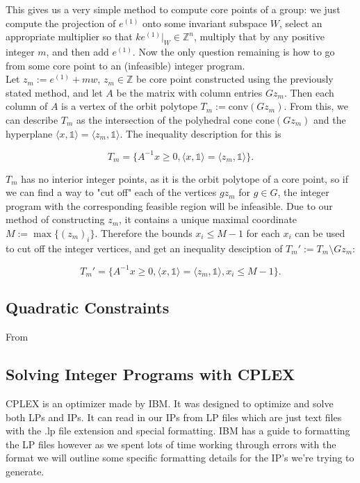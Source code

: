 \documentclass[11pt]{article} %
\theoremstyle{definition}
\theoremstyle{remark}
\newcommand{\ZZ}{\mathbb{Z}}
\begin{document}
This gives us a very simple method to compute core points of a group: we just compute the projection of $e^{(1)}$ onto some invariant subspace $W$, select an appropriate multiplier so that $ke^{(1)}|_W \in \ZZ^n$, multiply that by any positive integer $m$, and then add $e^{(1)}$. Now the only question remaining is how to go from some core point to an (infeasible) integer program.\\

Let $z_m := e^{(1)} + mw$, $z_m \in \ZZ$ be core point constructed using the previously stated method, and let $A$ be the matrix with column entries $Gz_m$. Then each column of $A$ is a vertex of the orbit polytope $T_m := \textrm{conv}(Gz_m)$. From this, we can describe $T_m$ as the intersection of the polyhedral cone $\textrm{cone}(Gz_m)$ and the hyperplane $\langle x,\mathds{1} \rangle = \langle z_m, \mathds{1} \rangle$. The inequality description for this is

\[ T_m = \lbrace A^{-1}x \geq 0, \langle x,\mathds{1} \rangle = \langle z_m, \mathds{1} \rangle \rbrace .\]

$T_m$ has no interior integer points, as it is the orbit polytope of a core point, so if we can find a way to "cut off" each of the vertices $gz_m$ for $g \in G$, the integer program with the corresponding feasible region will be infeasible. Due to our method of constructing $z_m$, it contains a unique maximal coordinate $M := \max \lbrace {(z_m)_i} \rbrace$. Therefore the bounds $x_i \leq M-1$ for each $x_i$ can be used to cut off the integer vertices, and get an inequality desciption of $T_m' := T_m \setminus Gz_m$:

\[ T_m' = \lbrace A^{-1}x \geq 0, \langle x,\mathds{1} \rangle = \langle z_m, \mathds{1} \rangle, x_i \leq M-1 \rbrace .\]


\subsection{Quadratic Constraints}

From 

\subsection{Solving Integer Programs with CPLEX}

CPLEX is an optimizer made by IBM. It was designed to optimize and solve both LPs and IPs. It can read in our IPs from LP files which are just text files with the .lp file extension and special formatting. IBM has a guide to formatting the LP files however as we spent lots of time working through errors with the format we will outline some specific formatting details for the IP's we're trying to generate. 
\end{document}

